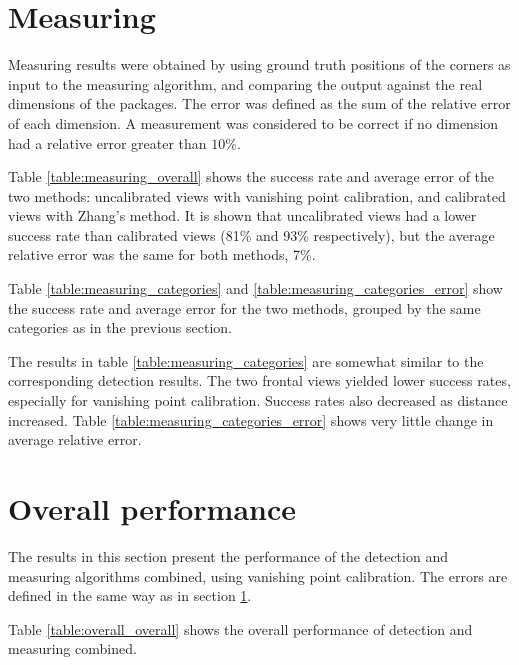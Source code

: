 \section{Measuring} \label{results:measuring} 
Measuring results were obtained by using ground truth positions of the corners as input to the measuring algorithm, and comparing the output against the real dimensions of the packages.
The error was defined as the sum of the relative error of each dimension.
A measurement was considered to be correct if no dimension had a relative error greater than $10\%$.

Table \ref{table:measuring_overall} shows the success rate and average error of the two methods: uncalibrated views with vanishing point calibration, and calibrated views with Zhang's method.
It is shown that uncalibrated views had a lower success rate than calibrated views (81\% and 93\% respectively), but the average relative error was the same for both methods, 7\%.


Table \ref{table:measuring_categories} and \ref{table:measuring_categories_error} show the success rate and average error for the two methods, grouped by the same categories as in the previous section.





The results in table \ref{table:measuring_categories} are somewhat similar to the corresponding detection results.
The two frontal views yielded lower success rates, especially for vanishing point calibration.
Success rates also decreased as distance increased.
Table \ref{table:measuring_categories_error} shows very little change in average relative error.

\section{Overall performance} \label{results:overall}
The results in this section present the performance of the detection and measuring algorithms combined, using vanishing point calibration.
The errors are defined in the same way as in section \ref{results:measuring}.

Table \ref{table:overall_overall} shows the overall performance of detection and measuring combined.



